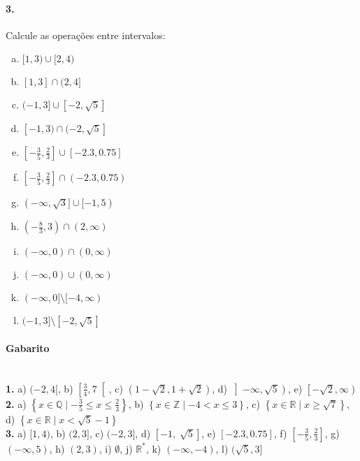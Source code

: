 \documentclass[a4paper,twocolumn,12pt]{article}
\begin{document}
\paragraph*{3. } Calcule as operações entre intervalos:
\begin{enumerate}[a)]
\item $[1, 3) \cup [2, 4)$
\item $[1, 3] \cap (2, 4]$
\item $(-1, 3] \cup  [-2, \sqrt{5}]$
\item $[-1, 3) \cap  (-2, \sqrt{5}]$
\item $\left[-\frac{3}{5},\frac{2}{3}\right] \cup [-2.3,0.75]$
\item $\left[-\frac{3}{5},\frac{2}{3}\right] \cap (-2.3,0.75)$
\item $(-\infty, \sqrt{3}] \cup [-1, 5)$
\item $\left(-\frac{8}{3},3\right)\cap (2,\infty)$
\item $(-\infty, 0) \cap (0, \infty)$
\item $(-\infty, 0) \cup (0, \infty)$
\item $(-\infty, 0] \setminus [-4, \infty)$
\item $(-1, 3] \setminus  [-2, \sqrt{5}]$
\end{enumerate}


 \vfill
{\footnotesize\color{darkgray}
  \paragraph*{Gabarito} \hspace*{\fill}\\
\textbf{1.} a) $(-2,4[$, b) $\left[\frac{3}{4},7\right[$, c) $\left(1-\sqrt{2},1+\sqrt{2}\right)$, d) $\left]-\infty,\sqrt{5}\right)$, e) $\left[-\sqrt{2},\infty\right)$\\
\textbf{2.} a) $\left\{x \in \mathbb{Q} \mid -\frac{3}{5} \leq x \leq \frac{2}{3}\right\}$, b) $\left\{x \in \mathbb{Z} \mid -4 < x \leq 3\right\}$, c) $\left\{x \in \mathbb{R} \mid x \geq \sqrt{7}\right\}$, d) $\left\{x \in \mathbb{R} \mid x < \sqrt{5}-1\right\}$\\
\textbf{3.} a) $[1,4)$, b) $(2,3]$, c) $(-2,3]$, d) $[-1,\sqrt[]{5}]$, e) $\left[-2.3,0.75\right]$, f) $\left[-\frac{3}{5},\frac{2}{3}\right]$, g) $(-\infty,5)$, h) $(2,3)$, i) $\emptyset$, j) $\mathbb{R}^*$, k) $(-\infty,-4)$, l) $(\sqrt{5},3]$
}
\end{document}

